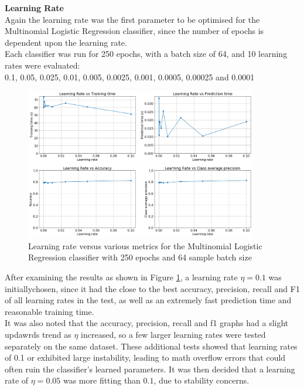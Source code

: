 \documentclass[11pt,a4paper]{article}
\begin{document}
\noindent\textbf{Learning Rate}\\
Again the learning rate was the first parameter to be optimised for the Multinomial Logistic Regression classifier, since the number of epochs is dependent upon the learning rate.\\

\noindent Each classifier was run for 250 epochs, with a batch size of 64, and 10 learning rates were evaluated:\\
0.1, 0.05, 0.025, 0.01, 0.005, 0.0025, 0.001, 0.0005, 0.00025 and 0.0001\\

\begin{figure}[H]
    \centering
    \includegraphics[width=0.9\textwidth]{img/mlr_eta_test.png}
    \caption{Learning rate versus various metrics for the Multinomial Logistic Regression classifier with 250 epochs and 64 sample batch size}
    \label{fig:multinomial_logistic_regression_eta_tuning}
\end{figure}

\noindent After examining the results as shown in Figure \ref{fig:multinomial_logistic_regression_eta_tuning}, a learning rate $\eta = 0.1$ was initiallychosen, since it had the close to the best accuracy, precision, recall and F1 of all learning rates in the test, as well as an extremely fast prediction time and reasonable training time.\\

\noindent It was also noted that the accuracy, precision, recall and f1 graphs had a slight updawrds trend as $\eta$ increased, so a few larger learning rates were tested separately on the same dataset. These additional tests showed that learning rates of 0.1 or exhibited large instability, leading to math overflow errors that could often ruin the classifier's learned parameters. It was then decided that a learning rate of $\eta = 0.05$ was more fitting than $0.1$, due to stability concerns.\\
\end{document}
